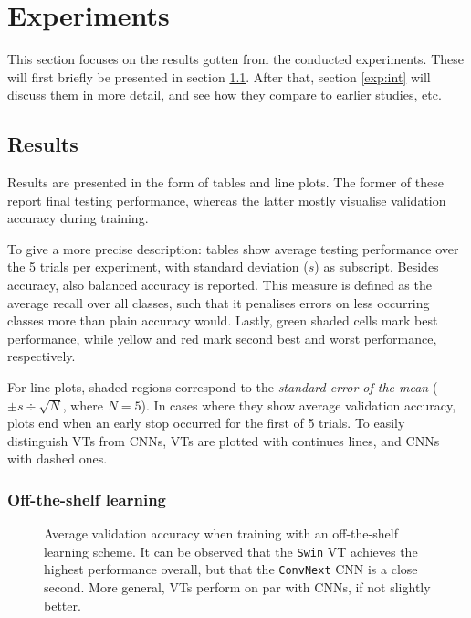 \section{Experiments}
This section focuses on the results gotten from the conducted experiments. These will first briefly be presented in section \ref{results}. After that, section \ref{exp:int} will discuss them in more detail, and see how they compare to earlier studies, etc.

\subsection{Results} \label{results}
Results are presented in the form of tables and line plots. The former of these report final testing performance, whereas the latter mostly visualise validation accuracy during training.

To give a more precise description: tables show average testing performance over the 5 trials per experiment, with standard deviation ($s$) as subscript. Besides accuracy, also balanced accuracy is reported. This measure is defined as the average recall over all classes, such that it penalises errors on less occurring classes more than plain accuracy would. Lastly, green shaded cells mark best performance, while yellow and red mark second best and worst performance, respectively.

For line plots, shaded regions correspond to the \textit{standard error of the mean} ($\pm s \div \sqrt{N}$, where $N=5$). In cases where they show average validation accuracy, plots end when an early stop occurred for the first of 5 trials. To easily distinguish VTs from CNNs, VTs are plotted with continues lines, and CNNs with dashed ones.

\subsubsection{Off-the-shelf learning} \label{results:ots}

\begin{figure}[tb]
    \centering
    \def\svgwidth{\textwidth}
    
    \caption{Average validation accuracy when training with an off-the-shelf learning scheme. It can be observed that the \texttt{Swin} VT achieves the highest performance overall, but that the \texttt{ConvNext} CNN is a close second. More general, VTs perform on par with CNNs, if not slightly better.}
    \label{results:img:ots}
\end{figure}

